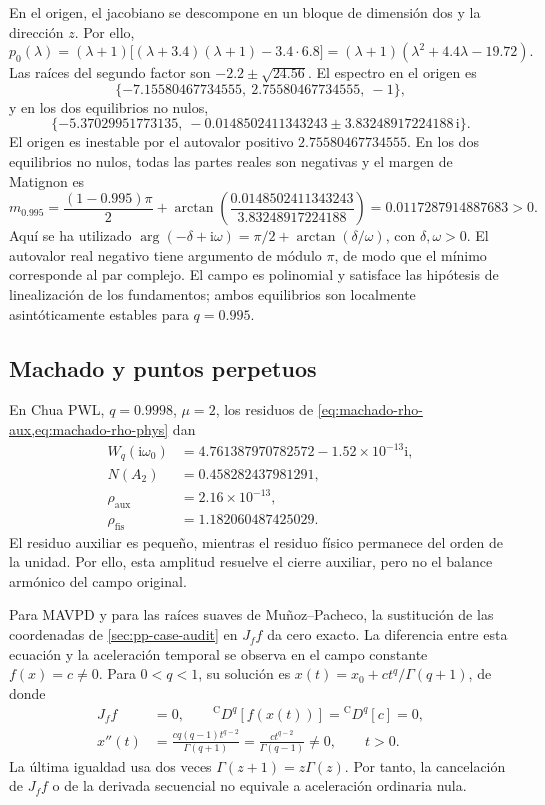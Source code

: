 En el origen, el jacobiano se descompone en un bloque de dimensión dos y la
dirección \(z\). Por ello,
\[
 p_0(\lambda)=(\lambda+1)
 \bigl[(\lambda+3.4)(\lambda+1)-3.4\cdot6.8\bigr]
 =(\lambda+1)(\lambda^2+4.4\lambda-19.72).
\]
Las raíces del segundo factor son \(-2.2\pm\sqrt{24.56}\).
El espectro en el origen es
\[
 \{-7.15580467734555,\ 2.75580467734555,\ -1\},
\]
y en los dos equilibrios no nulos,
\[
 \{-5.37029951773135,\
 -0.0148502411343243\pm3.83248917224188\,\mathrm i\}.
\]
El origen es inestable por el autovalor positivo
\(2.75580467734555\). En los dos equilibrios no nulos, todas las partes reales
son negativas y el margen de Matignon es
\[
 m_{0.995}
 =\frac{(1-0.995)\pi}{2}
  +\arctan\!\left(\frac{0.0148502411343243}{3.83248917224188}\right)
 =0.0117287914887683>0.
\]
Aquí se ha utilizado
\(\arg(-\delta+\mathrm i\omega)=\pi/2+\arctan(\delta/\omega)\),
con \(\delta,\omega>0\). El autovalor real negativo tiene argumento de
módulo \(\pi\), de modo que el mínimo corresponde al par complejo. El campo
es polinomial y satisface las hipótesis de linealización de los fundamentos;
ambos equilibrios son localmente asintóticamente estables para \(q=0.995\).

\subsection{Machado y puntos perpetuos}

En Chua PWL, \(q=0.9998\), \(\mu=2\), los residuos de
\cref{eq:machado-rho-aux,eq:machado-rho-phys} dan
\begin{align}
 W_q(\mathrm i\omega_0)
 &=4.761387970782572-1.52\times10^{-13}\mathrm i,\\
 N(A_2)&=0.458282437981291,\\
 \rho_{\mathrm{aux}}&=2.16\times10^{-13},\\
 \rho_{\mathrm{fis}}&=1.182060487425029.
\end{align}
El residuo auxiliar es pequeño, mientras el residuo físico permanece del
orden de la unidad. Por ello, esta amplitud resuelve el cierre auxiliar, pero
no el balance armónico del campo original.

Para MAVPD y para las raíces suaves de Muñoz--Pacheco, la sustitución de las
coordenadas de \cref{sec:pp-case-audit} en \(J_f f\) da cero exacto. La diferencia entre
esta ecuación y la aceleración temporal se observa en el campo constante
\(f(x)=c\ne0\). Para \(0<q<1\), su solución es
\(x(t)=x_0+ct^q/\Gamma(q+1)\), de donde
\begin{align*}
 J_ff&=0,\qquad {}^{\mathrm C}D^q[f(x(t))]={}^{\mathrm C}D^q[c]=0,\\
 x''(t)&=\frac{cq(q-1)t^{q-2}}{\Gamma(q+1)}
       =\frac{ct^{q-2}}{\Gamma(q-1)}\ne0,\qquad t>0.
\end{align*}
La última igualdad usa dos veces \(\Gamma(z+1)=z\Gamma(z)\).
Por tanto, la cancelación de \(J_ff\) o de la derivada secuencial no equivale
a aceleración ordinaria nula.
